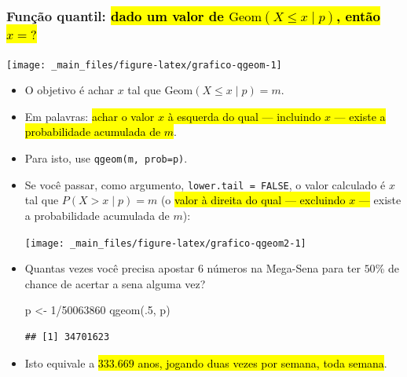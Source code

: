 \documentclass[
  11pt]{report}
\newenvironment{Shaded}{\begin{snugshade}}{\end{snugshade}}
\newcommand{\DecValTok}[1]{\textcolor[rgb]{0.00,0.00,0.81}{#1}}
\newcommand{\FunctionTok}[1]{\textcolor[rgb]{0.00,0.00,0.00}{#1}}
\newcommand{\NormalTok}[1]{#1}
\newcommand{\OtherTok}[1]{\textcolor[rgb]{0.56,0.35,0.01}{#1}}
\newcommand{\SpecialCharTok}[1]{\textcolor[rgb]{0.00,0.00,0.00}{#1}}
\renewenvironment{Shaded}{
    \begin{mdframed}[%
      roundcorner=2pt,%
      innerleftmargin=5pt,%
      innerrightmargin=5pt,%
      topline=true,%
      leftline=true,%
      rightline=true,%
      bottomline=true,%
      linewidth=0.5pt,%
      linecolor=black!20,%
      backgroundcolor=black!2,%
      skipabove=2ex,%
      skipbelow=2.5ex%
    ]%
  }
  {
    \end{mdframed}
  }
\begin{document}
\hypertarget{funuxe7uxe3o-quantil-dado-um-valor-de-textgeomx-leq-x-mid-p-entuxe3o-x}{%
\subsubsection*{\texorpdfstring{Função quantil: {\hl{dado um valor de $\text{Geom}(X \leq x \mid p)$, então $x ={} ?$}}}{Função quantil: dado um valor de , então }}\label{funuxe7uxe3o-quantil-dado-um-valor-de-textgeomx-leq-x-mid-p-entuxe3o-x}}

\begin{center}\texttt{[image: \_main\_files/figure-latex/grafico-qgeom-1]} \end{center}

\begin{itemize}
\item
  O objetivo é achar $x$ tal que $\text{Geom}(X \leq x \mid p) = m$.
\item
  Em palavras: {\hl{achar o valor $x$ à esquerda do qual --- incluindo $x$ --- existe a probabilidade acumulada de $m$}}.
\item
  Para isto, use \texttt{qgeom(m,\ prob=p)}.
\item
  Se você passar, como argumento, \texttt{lower.tail\ =\ FALSE}, o valor calculado é $x$ tal que $P(X > x \mid p) = m$ (o {\hl{valor à direita do qual --- excluindo $x$ ---}} existe a probabilidade acumulada de $m$):

  \begin{center}\texttt{[image: \_main\_files/figure-latex/grafico-qgeom2-1]} \end{center}
\item
  Quantas vezes você precisa apostar $6$ números na Mega-Sena para ter $50$\% de chance de acertar a sena alguma vez?

\begin{Shaded}
\begin{Highlighting}[]
\NormalTok{p }\OtherTok{\textless{}{-}} \DecValTok{1}\SpecialCharTok{/}\DecValTok{50063860}
\FunctionTok{qgeom}\NormalTok{(.}\DecValTok{5}\NormalTok{, p)}
\end{Highlighting}
\end{Shaded}

\begin{verbatim}
## [1] 34701623
\end{verbatim}
\item
  Isto equivale a {\hl{$333.669$ anos, jogando duas vezes por semana, toda semana}}.
\end{itemize}
\end{document}
